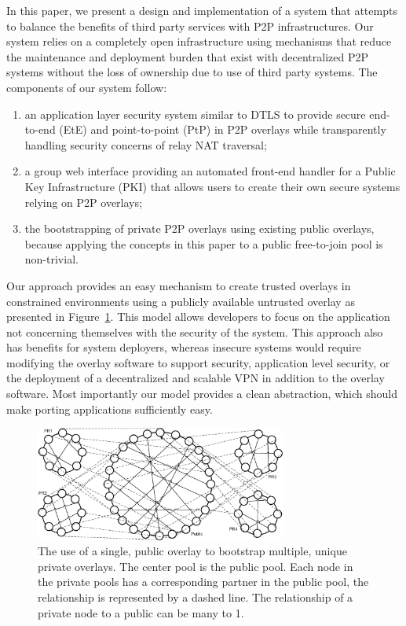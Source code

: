 \documentclass[conference]{IEEEtran}
\begin{document}
In this paper, we present a design and implementation of a system that attempts
to balance the benefits of third party services with P2P infrastructures.
Our system relies on a completely open infrastructure using mechanisms that
reduce the maintenance and deployment burden that exist with decentralized
P2P systems without the loss of ownership due to use of third party systems.
The components of our system follow:
\begin{enumerate}
\setlength{\itemsep}{0pt}
\setlength{\parskip}{0pt}
\item an application layer security system similar to DTLS to provide secure
end-to-end (EtE) and point-to-point (PtP) in P2P overlays while transparently
handling security concerns of relay NAT traversal;
\item a group web interface providing an automated front-end handler for a 
Public Key Infrastructure (PKI) that allows users to create their own secure
systems relying on P2P overlays;
\item the bootstrapping of private P2P overlays using existing public overlays,
because applying the concepts in this paper to a public free-to-join pool
is non-trivial.
\end{enumerate}

Our approach provides an easy mechanism to create trusted overlays in
constrained environments using a publicly available untrusted overlay as
presented in Figure~\ref{fig:subrings}.  This model allows developers to focus
on the application not concerning themselves with the security of the system.
This approach also has benefits for system deployers, whereas insecure systems
would require modifying the overlay software to support security, application
level security, or the deployment of a decentralized and scalable VPN in
addition to the overlay software.  Most importantly our model provides a clean
abstraction, which should make porting applications sufficiently easy.

\begin{figure}[h]
\centering
\includegraphics[width=3.25in]{subrings.eps}
\caption{The use of a single, public overlay to bootstrap multiple, unique
private overlays.  The center pool is the public pool.  Each node in the
private pools has a corresponding partner in the public pool, the relationship
is represented by a dashed line.  The relationship of a private node to a
public can be many to 1.}
\label{fig:subrings}
\end{figure}
\end{document}
